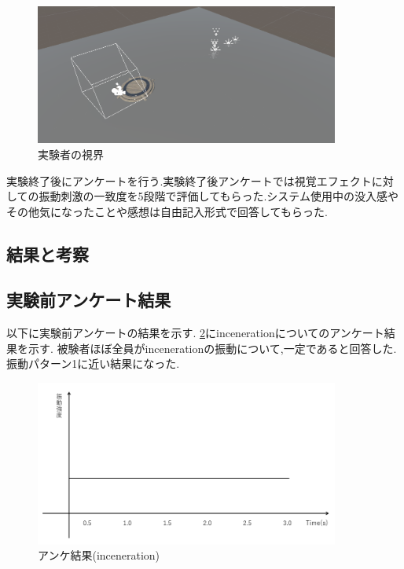 \begin{figure}[h]
\centering
\includegraphics[clip,width=10cm]{./fig/unity_first.png}
\caption{実験者の視界}\label{first}
\end{figure}

実験終了後にアンケートを行う.実験終了後アンケートでは視覚エフェクトに対しての振動刺激の一致度を5段階で評価してもらった.システム使用中の没入感やその他気になったことや感想は自由記入形式で回答してもらった.

\newpage

\subsection{結果と考察}
\subsection{実験前アンケート結果}
以下に実験前アンケートの結果を示す.
\ref{inceA}にincenerationについてのアンケート結果を示す.
被験者ほぼ全員がincenerationの振動について,一定であると回答した.
振動パターン1に近い結果になった.
\begin{figure}[h]
\centering
\includegraphics[clip,width=10cm]{fig/incenerationAve.png}
\caption{アンケ結果(inceneration)}\label{inceA}
\end{figure}


